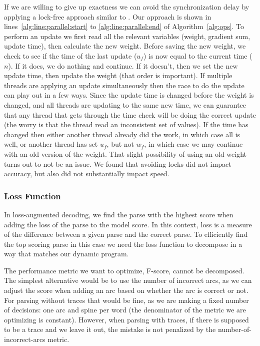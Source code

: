 If we are willing to give up exactness we can avoid the synchronization delay by applying a lock-free approach similar to \textcite{hogwild}.
Our approach is shown in lines~\ref{alg:line:parallel:start} to \ref{alg:line:parallel:end} of Algorithm~\ref{alg:ops}.
To perform an update we first read all the relevant variables (weight, gradient sum, update time), then calculate the new weight.
Before saving the new weight, we check to see if the time of the last update ($u_f$) is now equal to the current time ($n$).
If it does, we do nothing and continue.
If it doesn't, then we set the new update time, then update the weight (that order is important).
If multiple threads are applying an update simultaneously then the race to do the update can play out in a few ways.
Since the update time is changed before the weight is changed, and all threads are updating to the same new time, we can guarantee that any thread that gets through the time check will be doing the correct update (the worry is that the thread read an inconsistent set of values).
If the time has changed then either another thread already did the work, in which case all is well, or another thread has set $u_f$, but not $w_f$, in which case we may continue with an old version of the weight.
That slight possibility of using an old weight turns out to not be an issue.
We found that avoiding locks did not impact accuracy, but also did not substantially impact speed.

\subsubsection{Loss Function}

In loss-augmented decoding, we find the parse with the highest score when adding the loss of the parse to the model score.
In this context, loss is a measure of the difference between a given parse and the correct parse.
To efficiently find the top scoring parse in this case we need the loss function to decompose in a way that matches our dynamic program.

The performance metric we want to optimize, F-score, cannot be decomposed.
The simplest alternative would be to use the number of incorrect arcs, as we can adjust the score when adding an arc based on whether the arc is correct or not.
For parsing without traces that would be fine, as we are making a fixed number of decisions: one arc and spine per word (\myie the denominator of the metric we are optimizing is constant).
However, when parsing with traces, if there is supposed to be a trace and we leave it out, the mistake is not penalized by the number-of-incorrect-arcs metric.

